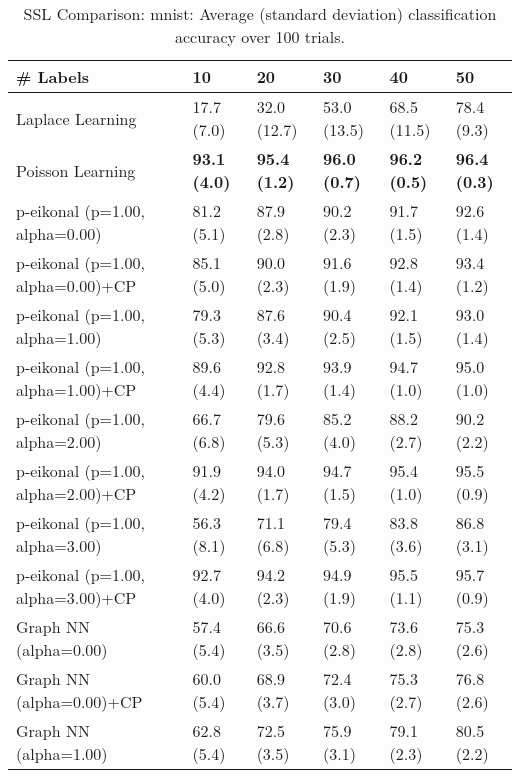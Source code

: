 \documentclass{article}
\begin{document}
\begin{table*}[t!]
\vspace{-3mm}
\caption{SSL Comparison: mnist: Average (standard deviation) classification accuracy over 100 trials.}
\vspace{-3mm}
\label{tab:SSL Comparison: mnist}
\vskip 0.15in
\begin{center}
\begin{small}
\begin{sc}
\begin{tabular}{llllll}
\toprule
\# Labels&\textbf{10}&\textbf{20}&\textbf{30}&\textbf{40}&\textbf{50}\\
\midrule
Laplace Learning&17.7 (7.0)      &32.0 (12.7)      &53.0 (13.5)      &68.5 (11.5)      &78.4 (9.3)      \\
Poisson Learning&{\bf 93.1 (4.0)}&{\bf 95.4 (1.2)}&{\bf 96.0 (0.7)}&{\bf 96.2 (0.5)}&{\bf 96.4 (0.3)}\\
p-eikonal (p=1.00, alpha=0.00)&81.2 (5.1)      &87.9 (2.8)      &90.2 (2.3)      &91.7 (1.5)      &92.6 (1.4)      \\
p-eikonal (p=1.00, alpha=0.00)+CP&85.1 (5.0)      &90.0 (2.3)      &91.6 (1.9)      &92.8 (1.4)      &93.4 (1.2)      \\
p-eikonal (p=1.00, alpha=1.00)&79.3 (5.3)      &87.6 (3.4)      &90.4 (2.5)      &92.1 (1.5)      &93.0 (1.4)      \\
p-eikonal (p=1.00, alpha=1.00)+CP&89.6 (4.4)      &92.8 (1.7)      &93.9 (1.4)      &94.7 (1.0)      &95.0 (1.0)      \\
p-eikonal (p=1.00, alpha=2.00)&66.7 (6.8)      &79.6 (5.3)      &85.2 (4.0)      &88.2 (2.7)      &90.2 (2.2)      \\
p-eikonal (p=1.00, alpha=2.00)+CP&91.9 (4.2)      &94.0 (1.7)      &94.7 (1.5)      &95.4 (1.0)      &95.5 (0.9)      \\
p-eikonal (p=1.00, alpha=3.00)&56.3 (8.1)      &71.1 (6.8)      &79.4 (5.3)      &83.8 (3.6)      &86.8 (3.1)      \\
p-eikonal (p=1.00, alpha=3.00)+CP&92.7 (4.0)      &94.2 (2.3)      &94.9 (1.9)      &95.5 (1.1)      &95.7 (0.9)      \\
Graph NN (alpha=0.00)&57.4 (5.4)      &66.6 (3.5)      &70.6 (2.8)      &73.6 (2.8)      &75.3 (2.6)      \\
Graph NN (alpha=0.00)+CP&60.0 (5.4)      &68.9 (3.7)      &72.4 (3.0)      &75.3 (2.7)      &76.8 (2.6)      \\
Graph NN (alpha=1.00)&62.8 (5.4)      &72.5 (3.5)      &75.9 (3.1)      &79.1 (2.3)      &80.5 (2.2)      \\

\end{tabular}
\end{sc}
\end{small}
\end{center}
\end{table*}
\end{document}
